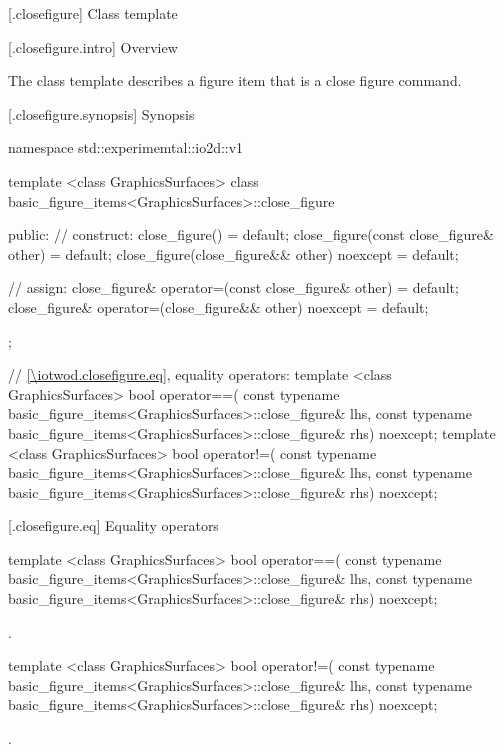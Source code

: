  [\iotwod.closefigure] {Class template }

 [\iotwod.closefigure.intro] {Overview}

\pnum
{}
The class template  describes a figure item that is a close figure command.

 [\iotwod.closefigure.synopsis] {Synopsis}
\begin{codeblock}
namespace std::experimemtal::io2d::v1 {
  template <class GraphicsSurfaces>
  class basic_figure_items<GraphicsSurfaces>::close_figure {
  public:
    // construct:
    close_figure() = default;
    close_figure(const close_figure& other) = default;
    close_figure(close_figure&& other) noexcept = default;

    // assign:
    close_figure& operator=(const close_figure& other) = default;
    close_figure& operator=(close_figure&& other) noexcept = default;
  };

  // \ref{\iotwod.closefigure.eq}, equality operators:
  template <class GraphicsSurfaces>
  bool operator==(
    const typename basic_figure_items<GraphicsSurfaces>::close_figure& lhs,
    const typename basic_figure_items<GraphicsSurfaces>::close_figure& rhs) 
    noexcept;  
  template <class GraphicsSurfaces>
  bool operator!=(
    const typename basic_figure_items<GraphicsSurfaces>::close_figure& lhs,
    const typename basic_figure_items<GraphicsSurfaces>::close_figure& rhs) 
    noexcept;
}
\end{codeblock}

 [\iotwod.closefigure.eq] {Equality operators}%

%
\begin{itemdecl}
template <class GraphicsSurfaces>
bool operator==(
  const typename basic_figure_items<GraphicsSurfaces>::close_figure& lhs,
  const typename basic_figure_items<GraphicsSurfaces>::close_figure& rhs)
  noexcept;
\end{itemdecl}
\begin{itemdescr}
\pnum
\returns {}.
\end{itemdescr}

%
\begin{itemdecl}
template <class GraphicsSurfaces>
bool operator!=(
  const typename basic_figure_items<GraphicsSurfaces>::close_figure& lhs,
  const typename basic_figure_items<GraphicsSurfaces>::close_figure& rhs)
  noexcept;
\end{itemdecl}
\begin{itemdescr}
\pnum
\returns {}.
\end{itemdescr}
